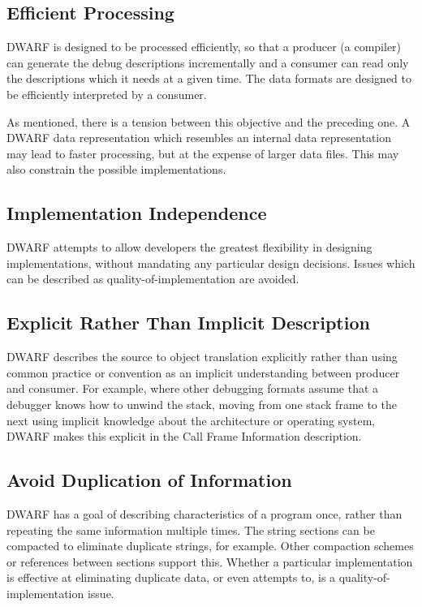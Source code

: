 \subsection{Efficient Processing} 
DWARF is designed to be processed efficiently, so that a 
producer (a compiler) can generate the debug descriptions 
incrementally and a consumer can read only the descriptions 
which it needs at a given time. The data formats are designed 
to be efficiently interpreted by a consumer.

As mentioned, there is a tension between this objective and 
the preceding one.  A DWARF data representation which resembles 
an internal data representation may lead to faster processing, 
but at the expense of larger data files. This may also constrain 
the possible implementations.

\subsection{Implementation Independence}
DWARF attempts to allow developers the greatest flexibility 
in designing implementations, without mandating any particular 
design decisions. Issues which can be described as 
\bb
quality-of-implementation
\eb
are avoided.

\bb
\subsection{Explicit Rather Than Implicit Description}
\eb
DWARF describes the source to object translation explicitly 
rather than using common practice or convention as an implicit 
understanding between producer and consumer.  For example, where 
other debugging formats assume that a debugger knows how to 
unwind the stack, moving from one stack frame to the next using 
implicit knowledge about the architecture or operating system, 
DWARF makes this explicit in the Call Frame Information description.

\subsection{Avoid Duplication of Information}
DWARF has a goal of describing characteristics of a program once, 
rather than repeating the same information multiple times.  The 
string sections can be compacted to eliminate duplicate strings, 
for example.  Other compaction schemes or references between 
\bb
sections 
\eb
support this. Whether a particular implementation is 
effective at eliminating duplicate data, or even attempts to, 
is a 
\bb
quality-of-implementation
\eb
issue.  

